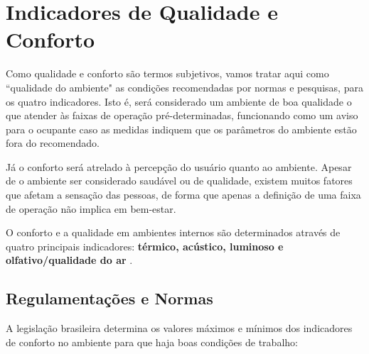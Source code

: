 \documentclass[../monografia.tex]{subfiles}
\begin{document}

\section{Indicadores de Qualidade e Conforto} \label{arte-indicadores}


Como qualidade e conforto são termos subjetivos, vamos tratar aqui como ``qualidade do ambiente" as condições recomendadas por normas e pesquisas, para os quatro indicadores. Isto é, será considerado um ambiente de boa qualidade o que atender às faixas de operação pré-determinadas, funcionando como um aviso para o ocupante caso as medidas indiquem que os parâmetros do ambiente estão fora do recomendado. 

Já o conforto será atrelado à percepção do usuário quanto ao ambiente. Apesar de o ambiente ser considerado saudável ou de qualidade, existem muitos fatores que afetam a sensação das pessoas, de forma que apenas a definição de uma faixa de operação não implica em bem-estar. 

O conforto e a qualidade em ambientes internos são determinados através de quatro principais indicadores: \textbf{térmico, acústico, luminoso e olfativo/qualidade do ar} \cite{ComfortBox}. 

\subsection{Regulamentações e Normas} %

A legislação brasileira determina os valores máximos e mínimos dos indicadores de conforto no ambiente para que haja boas condições de trabalho: 
\end{document}
